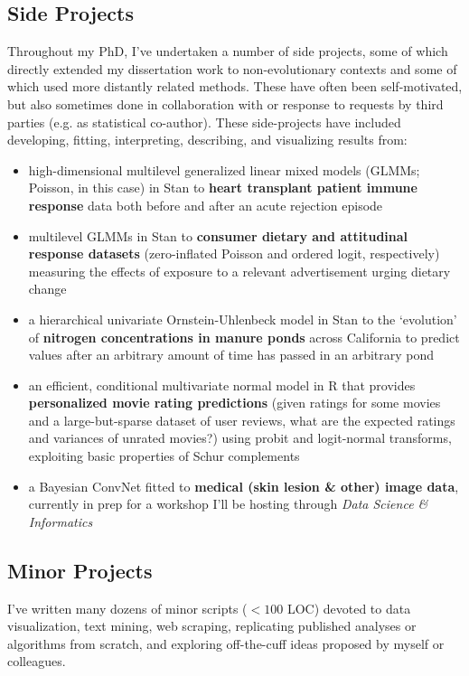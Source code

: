 \documentclass[12pt]{article}
\begin{document}
\subsection{Side Projects}

Throughout my PhD, I've undertaken a number of side projects, some of which directly extended my dissertation work to non-evolutionary contexts and some of which used more distantly related methods. These have often been self-motivated, but also sometimes done in collaboration with or response to requests by third parties (e.g. as statistical co-author). These side-projects have included developing, fitting,  interpreting, describing, and visualizing results from:

\begin{itemize}[noitemsep]

\item high-dimensional multilevel generalized linear mixed models (GLMMs; Poisson, in this case) in Stan to \textbf{heart transplant patient immune response} data both before and after an acute rejection episode
\item multilevel GLMMs in Stan to \textbf{consumer dietary and attitudinal response datasets} (zero-inflated Poisson and ordered logit, respectively) measuring the effects of exposure to a relevant advertisement urging dietary change
\item a hierarchical univariate Ornstein-Uhlenbeck model in Stan to the `evolution' of \textbf{nitrogen concentrations in manure ponds} across California to predict values after an arbitrary amount of time has passed in an arbitrary pond
\item an efficient, conditional multivariate normal model in R that provides \textbf{personalized movie rating predictions} (given ratings for some movies and a large-but-sparse dataset of user reviews, what are the expected ratings and variances of unrated movies?) using probit and logit-normal transforms, exploiting basic properties of Schur complements
\item a Bayesian ConvNet fitted to \textbf{medical (skin lesion \& other) image data}, currently in prep for a workshop I'll be hosting through \emph{Data Science \& Informatics}

\end{itemize}

\subsection{Minor Projects}
I've written many dozens of minor scripts ($<100$ LOC) devoted to data visualization, text mining, web scraping, replicating published analyses or algorithms from scratch, and exploring off-the-cuff ideas proposed by myself or colleagues.
\end{document}

